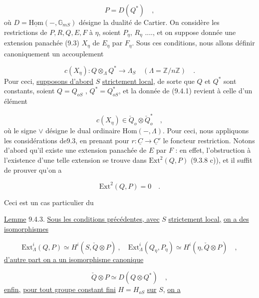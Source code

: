 \begin{equation*}
P = D(Q^*) \quad ,
\end{equation*}
où $D = \underline{\mathrm{Hom}}( -, \mathbb{G}_{mS})$ désigne la dualité de Cartier. On considère les restrictions de $P,R,Q,E,F$ à $\eta$, soient $P_\eta$, $R_\eta$ ...., et on suppose donnée une extension panachée (9.3) $X_\eta$ de $E_\eta$ par $F_\eta$. Sous ces conditions, nous allons définir canoniquement un accouplement

\begin{equation}\tag{9.4.1}
c(X_\eta) : Q \otimes_\Lambda Q^* \longrightarrow \Lambda_S \quad (\Lambda = \mathbb{Z}/n\mathbb{Z}) \quad .
\end{equation}
Pour ceci, \underline{supposons d'abord} $S$ \underline{strictement local}, de sorte que $Q$ et $Q^*$ sont constants, soient $Q = Q_{oS}$ , $Q^* = Q^*_{oS}$, et la donnée de (9.4.1) revient à celle d'un élément

\begin{equation}\tag{9.4.2}
c(X_\eta) \in \check{Q}_o \otimes \check{Q}^*_o \quad ,
\end{equation}
où le signe $\vee$ désigne le dual ordinaire $\mathrm{Hom}( - , \Lambda)$. Pour ceci, nous appliquons les considérations de9.3, en prenant pour $r: \underline{C} \longrightarrow \underline{C}'$ le foncteur restriction. Notons d'abord qu'il existe une extension panachée de $E$ par $F$ : en effet, l'obstruction à l'existence d'une telle extension se trouve dans $\mathrm{Ext}^2(Q,P)$ (9.3.8 c)), et il suffit de prouver qu'on a

\begin{equation*}
\mathrm{Ext}^2(Q,P) = 0 \quad .
\end{equation*}


Ceci est un cas particulier du

\underline{Lemme} 9.4.3.  \underline{Sous les conditions précédentes, avec} $S$ \underline{strictement local,} \underline{on a des isomorphismes}

\begin{equation*}
\mathrm{Ext}^i_\Lambda(Q,P) \simeq H^i(S,\check{Q}\otimes P) \ , \quad \mathrm{Ext}^i_\Lambda(Q_\eta,P_\eta) \simeq H^i(\eta,\check{Q} \otimes P) \quad ,
\end{equation*}
\underline{d'autre part on a un isomorphisme canonique}

\begin{equation}\tag{b)}
\check{Q}\otimes P \simeq D(Q\otimes Q^*) \quad ,
\end{equation}
\underline{enfin,} \underline{pour tout groupe constant fini} $H = H_{oS}$ \underline{sur} $S$, \underline{on a}

